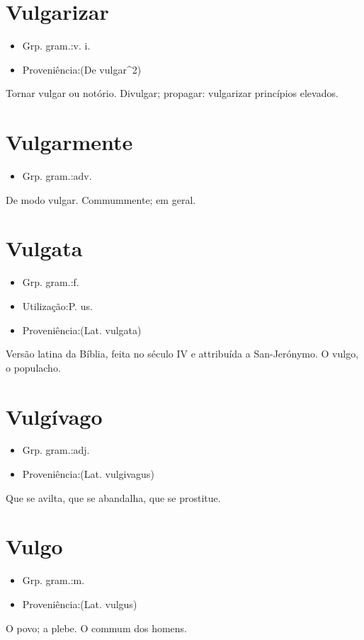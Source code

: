 \documentclass{article}
\begin{document}
\section{Vulgarizar}
\begin{itemize}
\item {Grp. gram.:v. i.}
\end{itemize}
\begin{itemize}
\item {Proveniência:(De \textunderscore vulgar\textunderscore ^2)}
\end{itemize}
Tornar vulgar ou notório.
Divulgar; propagar: \textunderscore vulgarizar princípios elevados\textunderscore .
\section{Vulgarmente}
\begin{itemize}
\item {Grp. gram.:adv.}
\end{itemize}
De modo vulgar.
Commummente; em geral.
\section{Vulgata}
\begin{itemize}
\item {Grp. gram.:f.}
\end{itemize}
\begin{itemize}
\item {Utilização:P. us.}
\end{itemize}
\begin{itemize}
\item {Proveniência:(Lat. \textunderscore vulgata\textunderscore )}
\end{itemize}
Versão latina da \textunderscore Bíblia\textunderscore , feita no século IV e attribuída a San-Jerónymo.
O vulgo, o populacho.
\section{Vulgívago}
\begin{itemize}
\item {Grp. gram.:adj.}
\end{itemize}
\begin{itemize}
\item {Proveniência:(Lat. \textunderscore vulgivagus\textunderscore )}
\end{itemize}
Que se avilta, que se abandalha, que se prostitue.
\section{Vulgo}
\begin{itemize}
\item {Grp. gram.:m.}
\end{itemize}
\begin{itemize}
\item {Proveniência:(Lat. \textunderscore vulgus\textunderscore )}
\end{itemize}
O povo; a plebe.
O commum dos homens.
\end{document}
